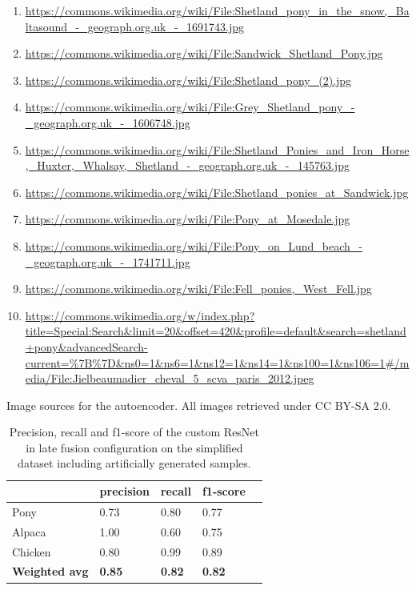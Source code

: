 \documentclass{l4proj}
\begin{document}
\begin{appendices}
\begin{captionedList}
  \begin{enumerate}
    \item{\url{https://commons.wikimedia.org/wiki/File:Shetland_pony_in_the_snow,_Baltasound_-_geograph.org.uk_-_1691743.jpg}}
    \item{\url{https://commons.wikimedia.org/wiki/File:Sandwick_Shetland_Pony.jpg}}
    \item{\url{https://commons.wikimedia.org/wiki/File:Shetland_pony_(2).jpg}}
    \item{\url{https://commons.wikimedia.org/wiki/File:Grey_Shetland_pony_-_geograph.org.uk_-_1606748.jpg}}
    \item{\url{https://commons.wikimedia.org/wiki/File:Shetland_Ponies_and_Iron_Horse,_Huxter,_Whalsay,_Shetland_-_geograph.org.uk_-_145763.jpg}}
    \item{\url{https://commons.wikimedia.org/wiki/File:Shetland_ponies_at_Sandwick.jpg}}
    \item{\url{https://commons.wikimedia.org/wiki/File:Pony_at_Mosedale.jpg}}
    \item{\url{https://commons.wikimedia.org/wiki/File:Pony_on_Lund_beach_-_geograph.org.uk_-_1741711.jpg}}
    \item{\url{https://commons.wikimedia.org/wiki/File:Fell_ponies,_West_Fell.jpg}}
    \item{\url{https://commons.wikimedia.org/w/index.php?title=Special:Search&limit=20&offset=420&profile=default&search=shetland+pony&advancedSearch-current=%7B%7D&ns0=1&ns6=1&ns12=1&ns14=1&ns100=1&ns106=1#/media/File:Jielbeaumadier_cheval_5_scva_paris_2012.jpeg}}
  \end{enumerate}
  \caption{Image sources for the autoencoder. All images retrieved under CC BY-SA 2.0.}
  \label{list:image_sources}
\end{captionedList}

\begin{table}[H]
  \centering
  \begin{tabular}{@{}lllll@{}}
  \toprule
                        & \textbf{precision} & \textbf{recall} & \textbf{f1-score} &  \\ \midrule
  Pony                  & 0.73               & 0.80            & 0.77              &  \\
  Alpaca                & 1.00               & 0.60            & 0.75              &  \\
  Chicken               & 0.80               & 0.99            & 0.89              &  \\
  \midrule
  \textbf{Weighted avg} & \textbf{0.85}      & \textbf{0.82}   & \textbf{0.82}     &  \\ \bottomrule
  \end{tabular}
  \vspace*{3mm}
  \caption{Precision, recall and f1-score of the custom ResNet in late fusion configuration on the simplified dataset including artificially generated samples.}
  \label{table:auto_scores_normal}
  \vspace*{-3mm}
\end{table}


\end{appendices}
\end{document}
